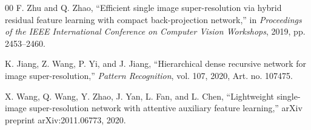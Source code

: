 \documentclass[conference]{IEEEtran}
\begin{document}
\begin{thebibliography}{00}
F. Zhu and Q. Zhao, ``Efficient single image super-resolution via hybrid residual feature learning with compact back-projection network,'' in \emph{Proceedings of the IEEE International Conference on Computer Vision Workshops}, 2019, pp. 2453--2460.

K. Jiang, Z. Wang, P. Yi, and J. Jiang, ``Hierarchical dense recursive network for image super-resolution,'' \emph{Pattern Recognition}, vol. 107, 2020, Art. no. 107475.

X. Wang, Q. Wang, Y. Zhao, J. Yan, L. Fan, and L. Chen, ``Lightweight single-image super-resolution network with attentive auxiliary feature learning,'' arXiv preprint arXiv:2011.06773, 2020.

\end{thebibliography}
\end{document}
